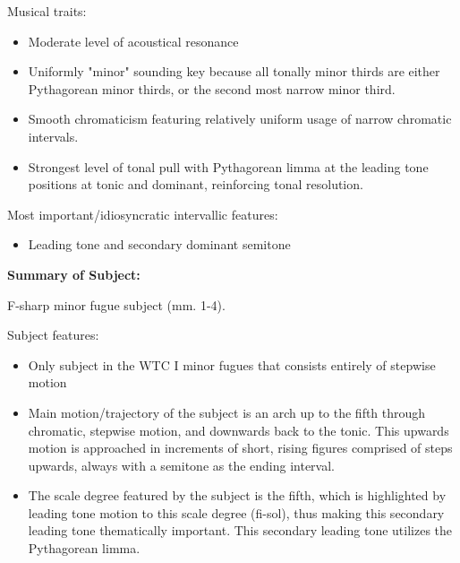 Musical traits:

\begin{itemize}
\tightlist
\item
  Moderate level of acoustical resonance
\item
  Uniformly "minor" sounding key because all tonally minor thirds are
  either Pythagorean minor thirds, or the second most narrow minor
  third.
\item
  Smooth chromaticism featuring relatively uniform usage of narrow
  chromatic intervals.
\item
  Strongest level of tonal pull with Pythagorean limma at the leading
  tone positions at tonic and dominant, reinforcing tonal resolution.
\end{itemize}

Most important/idiosyncratic intervallic features:

\begin{itemize}
\tightlist
\item
  Leading tone and secondary dominant semitone
\end{itemize}

\textbf{Summary of Subject:}



\begin{Example}[H]
    \begin{center}
    \caption{ F-sharp minor fugue subject (mm. 1-4). }
    \end{center}
\end{Example}
    


    \begin{center}
    \end{center}
    
    Subject features:

\begin{itemize}
\tightlist
\item
  Only subject in the WTC I minor fugues that consists entirely of
  stepwise motion
\item
  Main motion/trajectory of the subject is an arch up to the fifth
  through chromatic, stepwise motion, and downwards back to the tonic.
  This upwards motion is approached in increments of short, rising
  figures comprised of steps upwards, always with a semitone as the
  ending interval.
\item
  The scale degree featured by the subject is the fifth, which is
  highlighted by leading tone motion to this scale degree (fi-sol), thus
  making this secondary leading tone thematically important. This
  secondary leading tone utilizes the Pythagorean limma.
\end{itemize}

